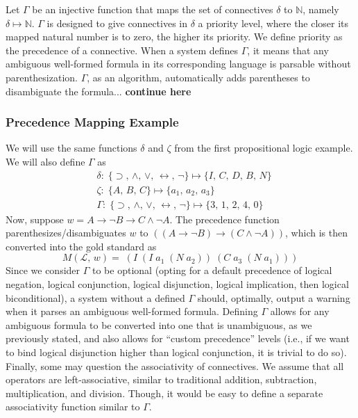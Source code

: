 \documentclass[ms]{uncgdissertationexp2}
\theoremstyle{plain}
\theoremstyle{definition}
\theoremstyle{remark}
\begin{document}
Let $\Gamma$ be an injective function that maps the set of connectives $\delta$ to $\mathbb{N}$, namely $\delta \mapsto \mathbb{N}$. $\Gamma$ is designed to give connectives in $\delta$ a priority level, where the closer its mapped natural number is to zero, the higher its priority. We define priority as the precedence of a connective. When a system defines $\Gamma$, it means that any ambiguous well-formed formula in its corresponding language is parsable without parenthesization. $\Gamma$, as an algorithm, automatically adds parentheses to disambiguate the formula... \textbf{continue here}

\subsubsection{Precedence Mapping Example} We will use the same functions $\delta$ and $\zeta$ from the first propositional logic example. We will also define $\Gamma$ as
\begin{align*}
	& \delta:\;\{\supset,\,\land,\,\lor,\,\leftrightarrow,\,\lnot\}\mapsto \{I,\,C,\,D,\,B,\,N\} \\
	& \zeta:\;\{A,\,B,\,C\} \mapsto \{a_{1},\,a_{2},\,a_{3}\} \\
	& \Gamma:\;\{\supset,\,\land,\,\lor,\,\leftrightarrow,\,\lnot\}\mapsto\{3,\,1,\,2,\,4,\,0\}                              
\end{align*}
Now, suppose $w = A \to \lnot B \to C \land \lnot A$. The precedence function parenthesizes/disambiguates $w$ to $((A \to \lnot B) \to (C \land \lnot A))$, which is then converted into the gold standard as
\[	
	M(\mathcal{L},\,w) =\;(I\;(I\;a_{1}\;(N\;a_{2}))\;(C\;a_{3}\;(N\;a_{1})))
\]
Since we consider $\Gamma$ to be optional (opting for a default precedence of logical negation, logical conjunction, logical disjunction, logical implication, then logical biconditional), a system without a defined $\Gamma$ should, optimally, output a warning when it parses an ambiguous well-formed formula. Defining $\Gamma$ allows for any ambiguous formula to be converted into one that is unambiguous, as we previously stated, and also allows for ``custom precedence'' levels (i.e., if we want to bind logical disjunction higher than logical conjunction, it is trivial to do so). Finally, some may question the associativity of connectives. We assume that all operators are left-associative, similar to traditional addition, subtraction, multiplication, and division. Though, it would be easy to define a separate associativity function similar to $\Gamma$.
\end{document}
